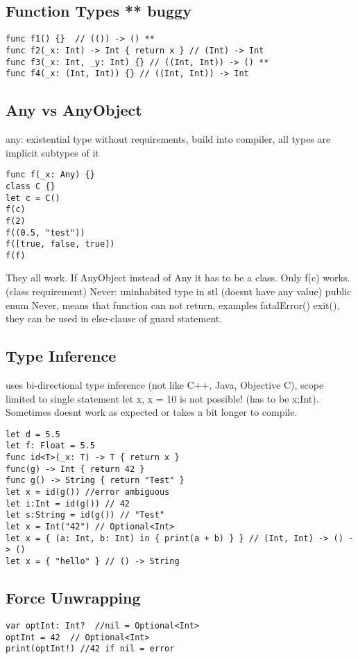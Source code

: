 \subsection{Function Types ** buggy}
\begin{lstlisting}
func f1() {}  // (()) -> () **
func f2(_x: Int) -> Int { return x } // (Int) -> Int
func f3(_x: Int, _y: Int) {} // ((Int, Int)) -> () **
func f4(_x: (Int, Int)) {} // ((Int, Int)) -> Int
\end{lstlisting}


\subsection{Any vs AnyObject}
any: existential type without requirements, build into compiler, all types are implicit subtypes of it
\begin{lstlisting}
func f(_x: Any) {}
class C {}
let c = C()
f(c)
f(2)
f((0.5, "test"))
f([true, false, true])
f(f)
\end{lstlisting}
They all work. If AnyObject instead of Any it has to be a class. Only f(c) works. (class requirement)
Never: uninhabited type in stl (doesnt have any value) public enum Never{}, means that function can not return, examples fatalError() exit(), they can be used in else-clause of guard statement.

\subsection{Type Inference}
uses bi-directional type inference (not like C++, Java, Objective C), scope limited to single statement
let x, x = 10 is not possible! (has to be x:Int). Sometimes doesnt work as expected or takes a bit longer to compile.
\begin{lstlisting}
let d = 5.5
let f: Float = 5.5
func id<T>(_x: T) -> T { return x }
func(g) -> Int { return 42 }
func g() -> String { return "Test" }
let x = id(g()) //error ambiguous
let i:Int = id(g()) // 42
let s:String = id(g()) // "Test"
let x = Int("42") // Optional<Int>
let x = { (a: Int, b: Int) in { print(a + b) } } // (Int, Int) -> () -> ()
let x = { "hello" } // () -> String
\end{lstlisting}

\subsection{Force Unwrapping}
\begin{lstlisting}
var optInt: Int?  //nil = Optional<Int>
optInt = 42  // Optional<Int>
print(optInt!) //42 if nil = error
\end{lstlisting}

